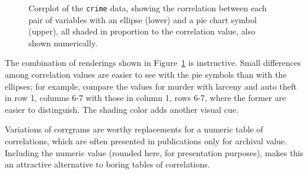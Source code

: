 \documentclass[
  letterpaper,
  10pt,
  krantz2]{krantz}
\begin{document}
{\begin{figure}[H]


\caption{\label{fig-crime-corrplot}Corrplot of the \texttt{crime} data,
showing the correlation between each pair of variables with an ellipse
(lower) and a pie chart symbol (upper), all shaded in proportion to the
correlation value, also shown numerically.}

\end{figure}%

The combination of renderings shown in Figure~\ref{fig-crime-corrplot}
is instructive. Small differences among correlation values are easier to
see with the pie symbols than with the ellipses; for example, compare
the values for murder with larceny and auto theft in row 1, columns 6-7
with those in column 1, rows 6-7, where the former are easier to
distinguish. The shading color adds another visual cue.

Variations of corrgrams are worthy replacements for a numeric table of
correlations, which are often presented in publications only for
archival value. Including the numeric value (rounded here, for
presentation purposes), makes this an attractive alternative to boring
tables of correlations.

}
\end{document}

